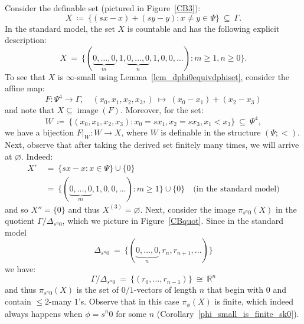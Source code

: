 \documentclass[11pt]{amsart}
\theoremstyle{plain}
\theoremstyle{definition}
\numberwithin{equation}{section}
\newcommand\R{\mathbb{R}}
\newcommand\0{\varnothing}
\begin{document}
\medskip\noindent
Consider the definable set (pictured in Figure~\ref{CB3}):
\[
X \ \coloneqq \ \{(sx-x)+(sy-y):x\neq y\in\Psi\} \ \subseteq \ \Gamma.
\]
In the standard model, the set $X$ is countable and has the following explicit description:
\[
X \ = \ \{(\underbrace{0,\ldots,0}_{m},1,\underbrace{0,\ldots,0}_{n},1,0,0,\ldots):m\geq 1,n\geq 0\}.
\]
To see that $X$ is $\infty$-small using Lemma~\ref{lem_dphi0equivdphiset}, consider the affine map:
\[
F \colon \Psi^4\to\Gamma,\quad (x_0,x_1,x_2,x_3,) \ \mapsto \ (x_0-x_1)+(x_2-x_3)
\]
and note that $X\subseteq\operatorname{image}(F)$. Moreover, for the set:
\[
W \ \coloneqq \ \{(x_0,x_1,x_2,x_3):x_0=sx_1,x_2=sx_3,x_1< x_3\} \ \subseteq \ \Psi^4,
\]
we have a bijection $F|_W\colon W\to X$, where $W$ is definable in the structure $(\Psi;<)$. Next, observe that after taking the derived set finitely many times, we will arrive at $\varnothing$. Indeed:
\begin{align*}
X' \ &= \ \{sx-x:x\in\Psi\}\cup\{0\} \\
&= \ \{(\underbrace{0,\ldots,0}_{m},1,0,0,\ldots):m\geq 1\}\cup \{0\} \quad \text{(in the standard model)}
\end{align*}
and so $X''=\{0\}$ and thus $X^{(3)}=\varnothing$.
Next, consider the image $\pi_{s^n0}(X)$ in the quotient $\Gamma/\Delta_{s^n0}$, which we picture in Figure~\ref{CBquot}. Since in the standard model
\[
\Delta_{s^n0} \ = \ \{(\underbrace{0,\ldots,0}_n,r_n,r_{n+1},\ldots)\}
\]
we have:
\[
\Gamma/\Delta_{s^n0} \ = \ \{(r_0,\ldots,r_{n-1})\} \ \cong \ \R^n
\]
and thus $\pi_{s^n0}(X)$ is the set of $0/1$-vectors of length $n$ that begin with $0$ and contain $\leq 2$-many $1$'s. Observe that in this case $\pi_{\phi}(X)$ is finite, which indeed always happens when $\phi=s^n0$ for some $n$ (Corollary~\ref{phi_small_is_finite_sk0}). 
\end{document}
